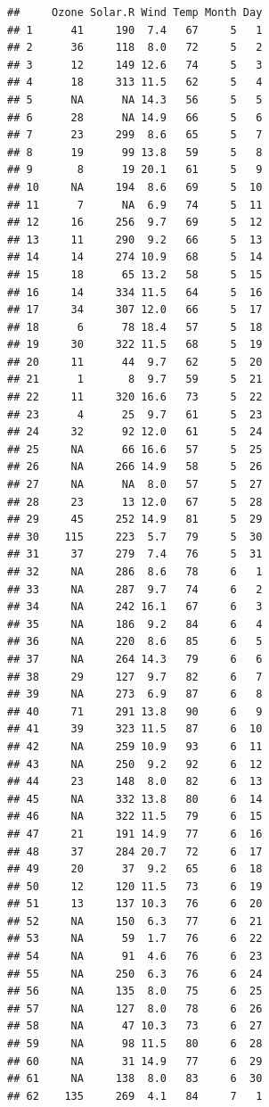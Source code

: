\documentclass[
]{book}
\begin{document}
\begin{verbatim}
##     Ozone Solar.R Wind Temp Month Day
## 1      41     190  7.4   67     5   1
## 2      36     118  8.0   72     5   2
## 3      12     149 12.6   74     5   3
## 4      18     313 11.5   62     5   4
## 5      NA      NA 14.3   56     5   5
## 6      28      NA 14.9   66     5   6
## 7      23     299  8.6   65     5   7
## 8      19      99 13.8   59     5   8
## 9       8      19 20.1   61     5   9
## 10     NA     194  8.6   69     5  10
## 11      7      NA  6.9   74     5  11
## 12     16     256  9.7   69     5  12
## 13     11     290  9.2   66     5  13
## 14     14     274 10.9   68     5  14
## 15     18      65 13.2   58     5  15
## 16     14     334 11.5   64     5  16
## 17     34     307 12.0   66     5  17
## 18      6      78 18.4   57     5  18
## 19     30     322 11.5   68     5  19
## 20     11      44  9.7   62     5  20
## 21      1       8  9.7   59     5  21
## 22     11     320 16.6   73     5  22
## 23      4      25  9.7   61     5  23
## 24     32      92 12.0   61     5  24
## 25     NA      66 16.6   57     5  25
## 26     NA     266 14.9   58     5  26
## 27     NA      NA  8.0   57     5  27
## 28     23      13 12.0   67     5  28
## 29     45     252 14.9   81     5  29
## 30    115     223  5.7   79     5  30
## 31     37     279  7.4   76     5  31
## 32     NA     286  8.6   78     6   1
## 33     NA     287  9.7   74     6   2
## 34     NA     242 16.1   67     6   3
## 35     NA     186  9.2   84     6   4
## 36     NA     220  8.6   85     6   5
## 37     NA     264 14.3   79     6   6
## 38     29     127  9.7   82     6   7
## 39     NA     273  6.9   87     6   8
## 40     71     291 13.8   90     6   9
## 41     39     323 11.5   87     6  10
## 42     NA     259 10.9   93     6  11
## 43     NA     250  9.2   92     6  12
## 44     23     148  8.0   82     6  13
## 45     NA     332 13.8   80     6  14
## 46     NA     322 11.5   79     6  15
## 47     21     191 14.9   77     6  16
## 48     37     284 20.7   72     6  17
## 49     20      37  9.2   65     6  18
## 50     12     120 11.5   73     6  19
## 51     13     137 10.3   76     6  20
## 52     NA     150  6.3   77     6  21
## 53     NA      59  1.7   76     6  22
## 54     NA      91  4.6   76     6  23
## 55     NA     250  6.3   76     6  24
## 56     NA     135  8.0   75     6  25
## 57     NA     127  8.0   78     6  26
## 58     NA      47 10.3   73     6  27
## 59     NA      98 11.5   80     6  28
## 60     NA      31 14.9   77     6  29
## 61     NA     138  8.0   83     6  30
## 62    135     269  4.1   84     7   1

\end{verbatim}
\end{document}
